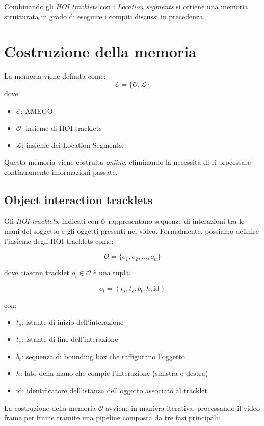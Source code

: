 Combinando gli \emph{HOI tracklets} con i \emph{Location segments} si ottiene una memoria strutturata in grado di eseguire i compiti discussi in precedenza.

\section{Costruzione della memoria}
La memoria viene definita come:
\[
\mathcal{E} = \{\mathcal{O}, \mathcal{L}\}
\]
dove:
\begin{itemize}
    \item $\mathcal{E}$: AMEGO
    \item $\mathcal{O}$: insieme di HOI tracklets
    \item $\mathcal{L}$: insieme dei Location Segments.
\end{itemize}

Questa memoria viene costruita \emph{online}, eliminando la necessità di ri-processare continuamente informazioni passate.

\subsection{Object interaction tracklets}
Gli \emph{HOI tracklets}, indicati con $\mathcal{O}$ rappresentano sequenze di interazioni tra le mani del soggetto e gli oggetti presenti nel video. Formalmente, possiamo definire l'insieme degli HOI tracklets come:

\[
\mathcal{O} = \{ o_1, o_2, \dots, o_n \}
\]

dove ciascun tracklet $o_i \in \mathcal{O}$ è una tupla:

\[
o_i = (t_s, t_e, b_t, h, \text{id})
\]

con:
\begin{itemize}
    \item $t_s$: istante di inizio dell'interazione
    \item $t_e$: istante di fine dell'interazione
    \item $b_t$: sequenza di bounding box che raffigurano l'oggetto
    \item $h$: lato della mano che compie l'interazione (sinistra o destra)
    \item $\text{id}$: identificatore dell'istanza dell'oggetto associato al tracklet
\end{itemize}

La costruzione della memoria $\mathcal{O}$ avviene in maniera iterativa, processando il video frame per frame tramite una pipeline composta da tre fasi principali:

